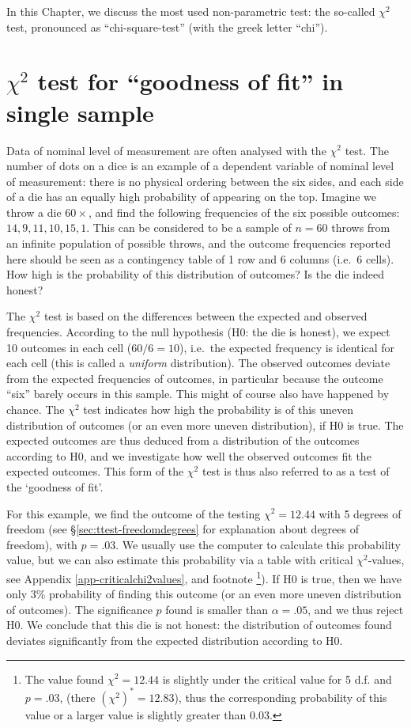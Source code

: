 \documentclass[
]{book}
\begin{document}
In this Chapter, we discuss the most used non-parametric
test: the so-called \(\chi^2\) test, pronounced as ``chi-square-test'' (with the greek letter ``chi'').

\hypertarget{sec:chi2gof}{%
\section{\texorpdfstring{\(\chi^2\) test for ``goodness of fit'' in single sample}{\textbackslash chi\^{}2 test for ``goodness of fit'' in single sample}}\label{sec:chi2gof}}

Data of nominal level of measurement are often analysed with the
\(\chi^2\) test. The number of dots on a dice
is an example of a dependent variable of nominal level of measurement:
there is no physical ordering between the six sides, and each side of a die has
an equally high probability of appearing on the top. Imagine we throw
a die \(60\times\), and find the following frequencies
of the six possible outcomes: \(14, 9, 11, 10, 15, 1\). This can be
considered to be a sample of \(n=60\) throws from an infinite
population of possible throws, and the outcome frequencies reported here should
be seen as a contingency table of 1 row and 6
columns (i.e.~6 cells). How high is the probability of this distribution
of outcomes? Is the die indeed honest?

The \(\chi^2\) test is based on the differences between the expected
and observed frequencies. According to the null hypothesis (H0: the die is honest),
we expect 10 outcomes in each cell (\(60/6=10\)), i.e.~the
expected frequency is identical for each cell (this is called
a \emph{uniform} distribution).
The observed outcomes deviate from the expected frequencies of outcomes,
in particular because the outcome ``six'' barely occurs in this sample. This
might of course also have happened by chance. The \(\chi^2\) test indicates how high the probability is of this uneven distribution of outcomes (or an even more uneven distribution),
if H0 is true.
The expected outcomes are thus deduced from a distribution of the outcomes
according to H0, and we investigate how well the observed outcomes
fit the expected outcomes. This form of the \(\chi^2\) test is thus also
referred to as a test of the `goodness of fit'.

For this example, we find the outcome of the testing \(\chi^2=12.44\)
with 5 degrees of freedom (see
§\ref{sec:ttest-freedomdegrees} for explanation about
degrees of freedom), with \(p=.03\). We usually use the computer to
calculate this probability value, but we can also estimate this probability
via a table with critical
\(\chi^2\)-values, see Appendix \ref{app-criticalchi2values}, and footnote
\footnote{The value found \(\chi^2=12.44\) is slightly under the critical value for 5 d.f. and \(p=.03\), (there \((\chi^2)^*=12.83\)), thus the corresponding probability of this value or a larger value is slightly greater than \(0.03\).}).
If H0 is true, then we have only 3\% probability
of finding this outcome (or an even more uneven distribution of outcomes).
The significance \(p\) found is smaller than \(\alpha=.05\), and we thus
reject H0. We conclude that this die is not honest: the distribution
of outcomes found deviates significantly from the expected
distribution according to H0.
\end{document}
